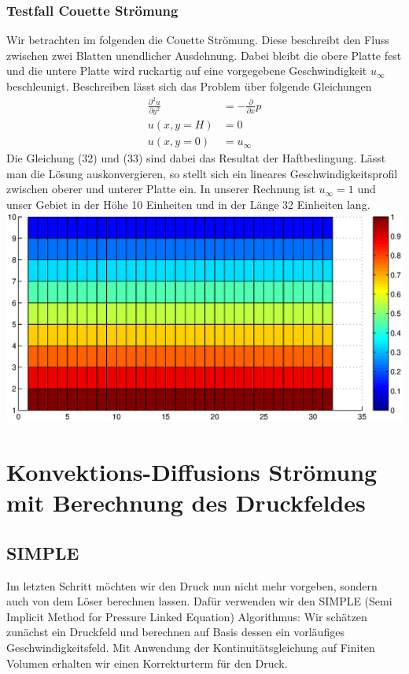\documentclass{article}
\newcommand{\ddx}{\frac{\partial }{\partial x}}
\begin{document}
\subsubsection{Testfall Couette Strömung}
Wir betrachten im folgenden die Couette Strömung. Diese beschreibt den Fluss zwischen zwei Blatten unendlicher Ausdehnung.
Dabei bleibt die obere Platte fest und die untere Platte wird ruckartig auf eine vorgegebene Geschwindigkeit $u_{\infty}$ beschleunigt.
Beschreiben lässt sich das Problem über folgende Gleichungen
\begin{align}
\frac{ \partial^2 u}{\partial y^2} &= -\ddx p \\
u(x,y=H) &= 0 \\
u(x,y=0) &= u_{\infty}
\end{align}
Die Gleichung (32) und (33) sind dabei das Resultat der Haftbedingung.\newpage
Lässt man die Lösung auskonvergieren, so stellt sich ein lineares Geschwindigkeitsprofil zwischen oberer und unterer Platte ein.
In unserer Rechnung ist $u_{\infty}=1$ und unser Gebiet in der Höhe 10 Einheiten und in der Länge 32 Einheiten lang.\\
\includegraphics[scale=0.6]{test/6cou/couette.eps}




\section{Konvektions-Diffusions Strömung \\ mit Berechnung des Druckfeldes}
\subsection{SIMPLE}
Im letzten Schritt möchten wir den Druck nun nicht mehr vorgeben, sondern auch von dem Löser berechnen lassen.
Dafür verwenden wir den SIMPLE (Semi Implicit Method for Pressure Linked Equation) Algorithmus:
Wir schätzen zunächst ein Druckfeld und berechnen auf Basis dessen ein vorläufiges Geschwindigkeitsfeld.
Mit Anwendung der Kontinuitätsgleichung auf Finiten Volumen erhalten wir einen Korrekturterm für den Druck.
\end{document}
